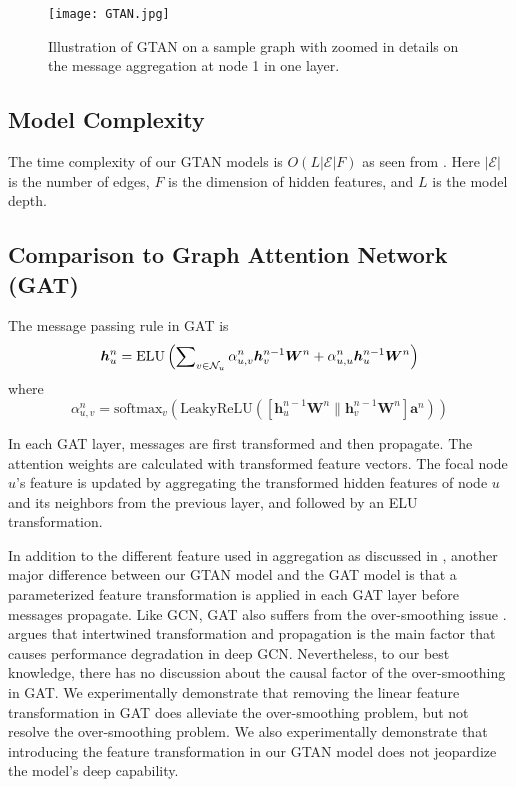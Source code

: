 \documentclass[lettersize,journal]{IEEEtran}
\theoremstyle{plain}
\theoremstyle{definition}
\theoremstyle{remark}
\begin{document}
\begin{figure}[h]
	\begin{center}
		\texttt{[image: GTAN.jpg]}
		\caption{Illustration of GTAN on a sample graph with zoomed in details on the message aggregation at node 1 in one layer.}
		\label{fig:GTAN}
	\end{center}
\end{figure}

\subsection{Model Complexity}
The time complexity of our GTAN models is $O(L \lvert \mathcal{E} \rvert F)$ as seen from . Here $\lvert \mathcal{E} \rvert$ is the number of edges, $F$ is the dimension of hidden features, and $L$ is the model depth. 

\subsection{Comparison to Graph Attention Network (GAT)}
\label{compare:GAT}
The message passing rule in GAT is
\begin{equation}
	\label{eqn:gat}
	\bm{h}_u^n = \text{ELU} \left( \sum\nolimits_{v\in \mathcal{N}_u} \alpha_{u,v}^n \bm{h}_v^{n-1} \bm{W}^n + \\
	\alpha_{u,u}^n \bm{h}_u^{n-1} \bm{W}^n \right) 
\end{equation}
where
\begin{equation}
	\alpha_{u,v}^n = \text{softmax}_v\left(
	\text{LeakyReLU}\left( \left[\bm{h}_u^{n-1} \bm{W}^n \parallel \bm{h}_v^{n-1} \bm{W}^n \right] \bm{a}^n \right)
	\right)
\end{equation}

In each GAT layer, messages are first transformed and then propagate. The attention weights are calculated with transformed feature vectors. The focal node $u$'s feature is updated by aggregating the transformed hidden features of node $u$ and its neighbors from the previous layer, and followed by an ELU transformation.

In addition to the different feature used in aggregation as discussed in , another major difference between our GTAN model and the GAT model is that a parameterized feature transformation is applied in each GAT layer before messages propagate. Like GCN, GAT also suffers from the over-smoothing issue \cite{wang2019improving}. \cite{liu2020towards} argues that intertwined transformation and propagation is the main factor that causes performance degradation in deep GCN. Nevertheless, to our best knowledge, there has no discussion about the causal factor of the over-smoothing in GAT. We experimentally demonstrate that removing the linear feature transformation in GAT does alleviate the over-smoothing problem, but not resolve the over-smoothing problem. We also experimentally demonstrate that introducing the feature transformation in our GTAN model does not jeopardize the model's deep capability.
\end{document}
